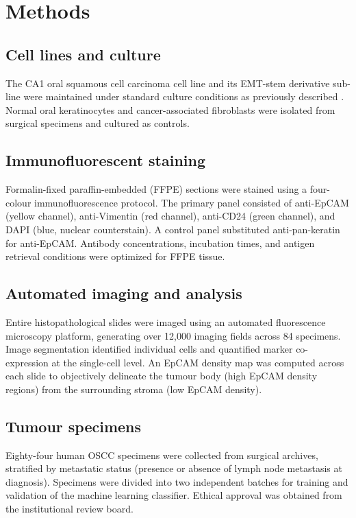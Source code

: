 \documentclass[11pt]{article}
\begin{document}
\section{Methods}

\subsection{Cell lines and culture}

The CA1 oral squamous cell carcinoma cell line and its EMT-stem derivative sub-line were maintained under standard culture conditions as previously described \citep{Grosse-Wilde2015}. Normal oral keratinocytes and cancer-associated fibroblasts were isolated from surgical specimens and cultured as controls.

\subsection{Immunofluorescent staining}

Formalin-fixed paraffin-embedded (FFPE) sections were stained using a four-colour immunofluorescence protocol. The primary panel consisted of anti-EpCAM (yellow channel), anti-Vimentin (red channel), anti-CD24 (green channel), and DAPI (blue, nuclear counterstain). A control panel substituted anti-pan-keratin for anti-EpCAM. Antibody concentrations, incubation times, and antigen retrieval conditions were optimized for FFPE tissue.

\subsection{Automated imaging and analysis}

Entire histopathological slides were imaged using an automated fluorescence microscopy platform, generating over 12,000 imaging fields across 84 specimens. Image segmentation identified individual cells and quantified marker co-expression at the single-cell level. An EpCAM density map was computed across each slide to objectively delineate the tumour body (high EpCAM density regions) from the surrounding stroma (low EpCAM density).

\subsection{Tumour specimens}

Eighty-four human OSCC specimens were collected from surgical archives, stratified by metastatic status (presence or absence of lymph node metastasis at diagnosis). Specimens were divided into two independent batches for training and validation of the machine learning classifier. Ethical approval was obtained from the institutional review board.
\end{document}
